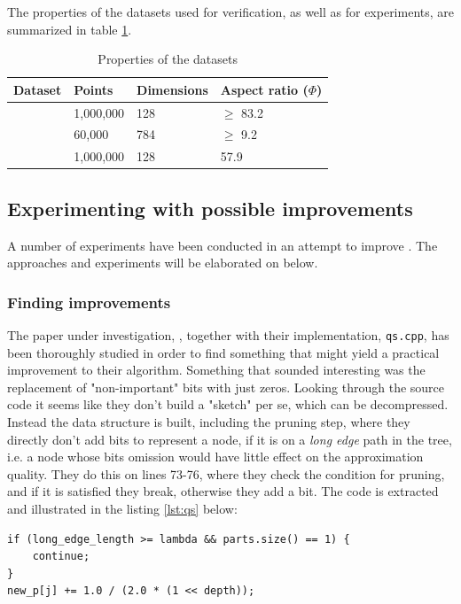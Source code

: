 The properties of the datasets used for verification, as well as for experiments, are summarized in table \ref{tab:datasets}.

\begin{table}[h]
	\centering
	\begin{tabular}{l l l l}
		\hline
		Dataset & Points & Dimensions & Aspect ratio ($\Phi$) \\
		\hline
		\sift{} & 1,000,000 & 128 & $\geq$ 83.2 \\
		\mnist{} & 60,000 & 784 & $\geq$ 9.2 \\
		\clust{} & 1,000,000 & 128 & 57.9 \\
		\hline
	\end{tabular}
	\caption{Properties of the datasets}
	\label{tab:datasets}
\end{table}

\subsection{Experimenting with possible improvements}
\label{possible_improvements}
A number of experiments have been conducted in an attempt to improve \qs{}. The approaches and experiments will be elaborated on below.

\subsubsection{Finding improvements}
\label{finding_improvements}
The paper under investigation, \cite{wagner17}, together with their implementation, \texttt{qs.cpp}, has been thoroughly studied in order to find something that might yield a practical improvement to their algorithm. Something that sounded interesting was the replacement of "non-important" bits with just zeros. Looking through the source code it seems like they don't build a "sketch" per se, which can be decompressed. Instead the \qt{} data structure is built, including the pruning step, where they directly don't add bits to represent a node, if it is on a \textit{long edge} path in the tree, i.e. a node whose bits omission would have little effect on the approximation quality\cite[p. 3, l. 14]{wagner17}. They do this on lines 73-76, where they check the condition for pruning, and if it is satisfied they break, otherwise they add a bit. The code is extracted and illustrated in the listing \ref{lst:qs} below:

\begin{lstlisting}[caption={Pruning},label={lst:qs}]
if (long_edge_length >= lambda && parts.size() == 1) {
	continue;
}
new_p[j] += 1.0 / (2.0 * (1 << depth));
\end{lstlisting}

